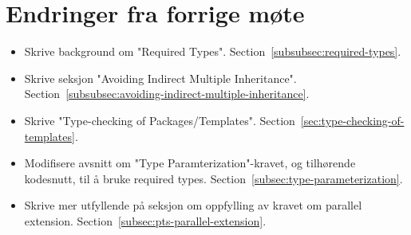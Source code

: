 
\chapter*{Endringer fra forrige møte}

\begin{itemize}
    \item Skrive background om "Required Types".
    Section~\vref{subsubsec:required-types}.
    \item Skrive seksjon "Avoiding Indirect Multiple Inheritance".
    Section~\vref{subsubsec:avoiding-indirect-multiple-inheritance}.
    \item Skrive "Type-checking of Packages/Templates".
    Section~\vref{sec:type-checking-of-templates}.
    \item Modifisere avsnitt om "Type Paramterization"-kravet, og tilhørende kodesnutt, til å bruke required types.
    Section~\vref{subsec:type-parameterization}.
    \item Skrive mer utfyllende på seksjon om oppfylling av kravet om parallel extension.
    Section~\vref{subsec:pts-parallel-extension}.
\end{itemize}


